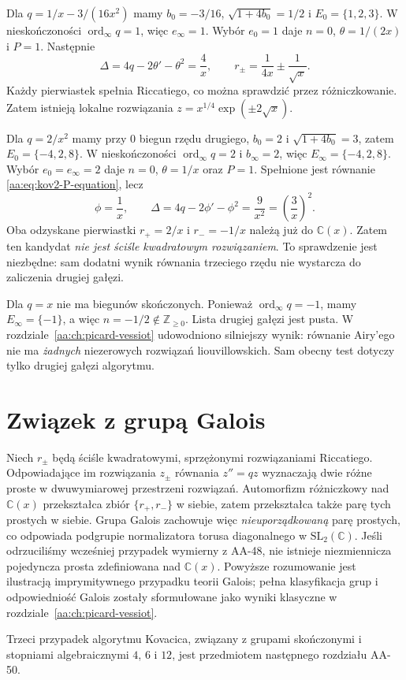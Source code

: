 \begin{przyklad}
\label{aa:prz:kov2-infinity-one}
Dla
$q=1/x-3/(16x^2)$
mamy
$b_0=-3/16$,
$\sqrt{1+4b_0}=1/2$
i $E_0=\{1,2,3\}$.
W nieskończoności
$\operatorname{ord}_\infty q=1$,
więc $e_\infty=1$.
Wybór $e_0=1$
daje $n=0$,
$\theta=1/(2x)$
i $P=1$.
Następnie
\[
 \Delta=4q-2\theta'-\theta^2=\frac4x,
 \qquad
 r_\pm=\frac1{4x}\pm\frac1{\sqrt{x}}.
\]
Każdy pierwiastek
spełnia Riccatiego,
co można sprawdzić
przez różniczkowanie.
Zatem istnieją lokalne
rozwiązania
$z=x^{1/4}\exp(\pm2\sqrt{x})$.
\end{przyklad}

\begin{przyklad}
\label{aa:prz:kov2-square-discriminant}
Dla $q=2/x^2$ mamy przy
$0$ biegun rzędu drugiego,
$b_0=2$ i
$\sqrt{1+4b_0}=3$,
zatem $E_0=\{-4,2,8\}$.
W nieskończoności
$\operatorname{ord}_\infty q=2$
i $b_\infty=2$, więc
$E_\infty=\{-4,2,8\}$.
Wybór $e_0=e_\infty=2$
daje $n=0$,
$\theta=1/x$ oraz $P=1$.
Spełnione jest równanie
\eqref{aa:eq:kov2-P-equation},
lecz
\[
 \phi=\frac1x,\qquad
 \Delta=4q-2\phi'-\phi^2
       =\frac9{x^2}
       =\left(\frac3x\right)^2.
\]
Oba odzyskane pierwiastki
$r_+=2/x$ i $r_-=-1/x$
należą już do $\mathbb C(x)$.
Zatem ten kandydat
\emph{nie jest ściśle
kwadratowym rozwiązaniem}.
To sprawdzenie jest niezbędne:
sam dodatni wynik równania
trzeciego rzędu nie wystarcza
do zaliczenia drugiej gałęzi.
\end{przyklad}

\begin{przyklad}
\label{aa:prz:kov2-airy}
Dla $q=x$ nie ma
biegunów skończonych.
Ponieważ
$\operatorname{ord}_\infty q=-1$,
mamy $E_\infty=\{-1\}$,
a więc
$n=-1/2\notin\mathbb Z_{\ge0}$.
Lista drugiej gałęzi
jest pusta.
W rozdziale~\ref{aa:ch:picard-vessiot}
udowodniono silniejszy
wynik: równanie Airy'ego
nie ma \emph{żadnych}
niezerowych rozwiązań
liouvillowskich.
Sam obecny test
dotyczy tylko drugiej
gałęzi algorytmu.
\end{przyklad}

\section{Związek z grupą Galois}

Niech $r_\pm$
będą ściśle kwadratowymi,
sprzężonymi rozwiązaniami
Riccatiego.
Odpowiadające im
rozwiązania $z_\pm$
równania $z''=qz$
wyznaczają dwie różne
proste w dwuwymiarowej
przestrzeni rozwiązań.
Automorfizm różniczkowy
nad $\mathbb C(x)$
przekształca zbiór
$\{r_+,r_-\}$
w siebie, zatem
przekształca także
parę tych prostych
w siebie. Grupa Galois
zachowuje więc
\emph{nieuporządkowaną}
parę prostych,
co odpowiada
podgrupie normalizatora
torusa diagonalnego
w $\mathrm{SL}_2(\mathbb C)$.
Jeśli odrzuciliśmy
wcześniej przypadek
wymierny z AA-48,
nie istnieje
niezmiennicza pojedyncza
prosta zdefiniowana
nad $\mathbb C(x)$.
Powyższe rozumowanie
jest ilustracją
imprymitywnego
przypadku teorii Galois;
pełna klasyfikacja
grup i odpowiedniość
Galois zostały
sformułowane jako
wyniki klasyczne
w rozdziale~\ref{aa:ch:picard-vessiot}.

Trzeci przypadek algorytmu
Kovacica, związany
z grupami skończonymi
i stopniami algebraicznymi
$4$, $6$ i $12$,
jest przedmiotem
następnego rozdziału AA-50.
